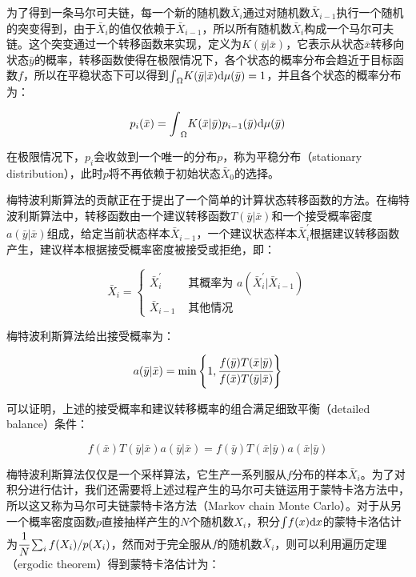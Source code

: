 为了得到一条马尔可夫链，每一个新的随机数$\bar{X}_i$通过对随机数$\bar{X}_{i-1}$执行一个随机的突变得到，由于$\bar{X}_i$的值仅依赖于$\bar{X}_{i-1}$，所以所有随机数$\bar{X}_i$构成一个马尔可夫链。这个突变通过一个转移函数来实现，定义为$K(\bar{y}|\bar{x})$，它表示从状态$\bar{x}$转移向状态$\bar{y}$的概率，转移函数使得在极限情况下，各个状态的概率分布会趋近于目标函数$f$，所以在平稳状态下可以得到${\rm \int}_{\Omega}K(\bar{y}|\bar{x}){\rm d}\mu (\bar{y})=1$，并且各个状态的概率分布为：

\begin{equation}
	p_i(\bar{x})={\rm \int}_{\Omega}K(\bar{x}|\bar{y})p_{i-1}(\bar{y}){\rm d}\mu(\bar{y})
\end{equation}

\noindent 在极限情况下，$p_i$会收敛到一个唯一的分布$p$，称为平稳分布（stationary distribution），此时$p$将不再依赖于初始状态$\bar{X}_0$的选择。

梅特波利斯算法的贡献正在于提出了一个简单的计算状态转移函数的方法。在梅特波利斯算法中，转移函数由一个建议转移函数$T(\bar{y}|\bar{x})$和一个接受概率密度$a(\bar{y}|\bar{x})$组成，给定当前状态样本$\bar{X}_{i-1}$，一个建议状态样本$\bar{X}^{'}_i$根据建议转移函数产生，建议样本根据接受概率密度被接受或拒绝，即：

\begin{equation}
	\bar{X}_i=\begin{cases}
		\bar{X}^{'}_i & \text{ 其概率为 }a(\bar{X}^{'}_i|\bar{X}_{i-1})\\
		\bar{X}_{i-1} & \text{ 其他情况 }
	\end{cases}
\end{equation}

\noindent 梅特波利斯算法给出接受概率为：

\begin{equation}\label{e:mlt-acceptance}
	a(\bar{y}|\bar{x})=\min \Bigg\{1, \cfrac{f(\bar{y})T(\bar{x}|\bar{y})}{f(\bar{x})T(\bar{y}|\bar{x})}\Bigg\}
\end{equation}

\noindent 可以证明，上述的接受概率和建议转移概率的组合满足细致平衡（detailed balance）条件：

\begin{equation}
	f(\bar{x})T(\bar{y}|\bar{x})a(\bar{y}|\bar{x})=f(\bar{y})T(\bar{x}|\bar{y})a(\bar{x}|\bar{y})
\end{equation}

\noindent 梅特波利斯算法仅仅是一个采样算法，它生产一系列服从$f$分布的样本$\bar{X}_i$。为了对积分进行估计，我们还需要将上述过程产生的马尔可夫链运用于蒙特卡洛方法中，所以这又称为马尔可夫链蒙特卡洛方法（Markov chain Monte Carlo）。对于从另一个概率密度函数$p$直接抽样产生的$N$个随机数$X_i$，积分${\rm \int} f(x){\rm d}x$的蒙特卡洛估计为$ \cfrac{1}{N}\sum_i f(X_i)/p(X_i)$，然而对于完全服从$f$的随机数$\bar{X}_i$，则可以利用遍历定理（ergodic theorem）得到蒙特卡洛估计为：

